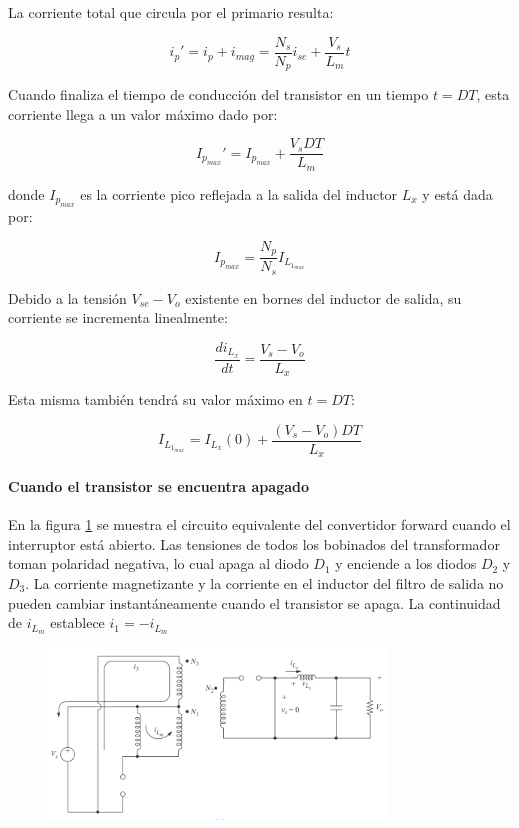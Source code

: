 La corriente total que circula por el primario resulta:

$$ i_p'=i_p+i_{mag}=\frac{N_s}{N_p}i_{se}+\frac{V_s}{L_m}t $$

Cuando finaliza el tiempo de conducción del transistor en un tiempo $t=DT$, esta corriente llega a un valor máximo dado por:

$$ I_{p_{max}}'=I_{p_{max}}+\frac{V_sDT}{L_m} $$

donde $I_{p_{max}}$ es la corriente pico reflejada a la salida del inductor $L_x$ y está dada por:

$$ I_{p_{max}}=\frac{N_p}{N_s}I_{L_{1_{max}}} $$

Debido a la tensión $V_{se}-V_o$ existente en bornes del inductor de salida, su corriente se incrementa linealmente:

$$ \frac{di_{L_x}}{dt}=\frac{V_s-V_o}{L_x} $$

Esta misma también tendrá su valor máximo en $t=DT$:

$$ I_{L_{1_{max}}}=I_{L_x}(0)+\frac{(V_s-V_o)DT}{L_x} $$

\paragraph{Cuando el transistor se encuentra apagado}
En la figura \ref{fig:forward_switch_open} se muestra el circuito equivalente del convertidor forward cuando el interruptor está abierto. 
Las tensiones de todos los bobinados del transformador toman polaridad negativa, lo cual apaga al diodo $D_1$ y enciende a los diodos $D_2$ y $D_3$. 
La corriente magnetizante y la corriente en el inductor del filtro de salida no pueden cambiar instantáneamente cuando el transistor se apaga. 
La continuidad de $i_{L_m}$ establece $ i_1=-i_{L_m} $

\begin{figure}[ht]
    \centering
    \includegraphics[width=0.8\textwidth]{../images/hart/forward_switch_open.png}
    \caption{}
    \label{fig:forward_switch_open}
\end{figure}

